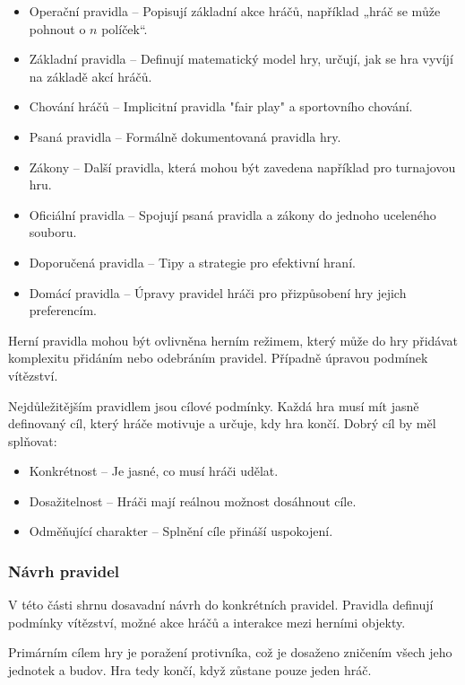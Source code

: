 \begin{itemize}
    \item Operační pravidla -- Popisují základní akce hráčů, například „hráč se může pohnout o $n$ políček“.
    \item Základní pravidla -- Definují matematický model hry, určují, jak se hra vyvíjí na základě akcí hráčů.
    \item Chování hráčů -- Implicitní pravidla "fair play" a sportovního chování.
    \item Psaná pravidla -- Formálně dokumentovaná pravidla hry.
    \item Zákony -- Další pravidla, která mohou být zavedena například pro turnajovou hru.
    \item Oficiální pravidla -- Spojují psaná pravidla a zákony do jednoho uceleného souboru.
    \item Doporučená pravidla -- Tipy a strategie pro efektivní hraní.
    \item Domácí pravidla -- Úpravy pravidel hráči pro přizpůsobení hry jejich preferencím.
\end{itemize}

Herní pravidla mohou být ovlivněna herním režimem, který může do hry přidávat komplexitu přidáním nebo odebráním pravidel. Případně úpravou podmínek vítězství.

Nejdůležitějším pravidlem jsou cílové podmínky. Každá hra musí mít jasně definovaný cíl, který hráče motivuje a určuje, kdy hra končí. Dobrý cíl by měl splňovat:

\begin{itemize}
    \item Konkrétnost -- Je jasné, co musí hráči udělat.
    \item Dosažitelnost -- Hráči mají reálnou možnost dosáhnout cíle.
    \item Odměňující charakter -- Splnění cíle přináší uspokojení.
\end{itemize}

\subsubsection{Návrh pravidel}

V této části shrnu dosavadní návrh do konkrétních pravidel. Pravidla definují podmínky vítězství, možné akce hráčů a interakce mezi herními objekty.

Primárním cílem hry je poražení protivníka, což je dosaženo zničením všech jeho jednotek a budov. Hra tedy končí, když zůstane pouze jeden hráč.

